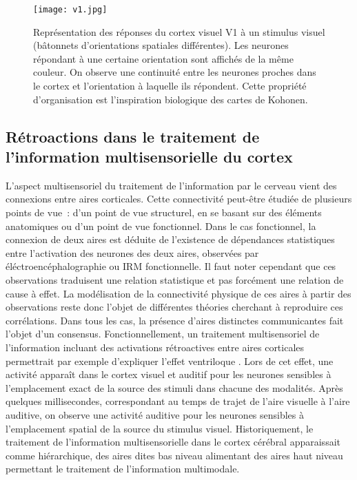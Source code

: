 \documentclass[../main]{subfiles}
\begin{document}
\begin{figure}
\centering
\texttt{[image: v1.jpg]}
\caption{Représentation des réponses du cortex visuel V1 à un stimulus visuel (bâtonnets d'orientations spatiales différentes). Les neurones répondant à une certaine orientation sont affichés de la même couleur. On observe une continuité entre les neurones proches dans le cortex et l'orientation à laquelle ils répondent. Cette propriété d'organisation est l'inspiration biologique des cartes de Kohonen.\label{fig:v1}}

\end{figure}

\subsection{Rétroactions dans le traitement de l'information multisensorielle du cortex}
L'aspect multisensoriel du traitement de l'information par le cerveau vient des connexions entre aires corticales.
Cette connectivité peut-être étudiée de plusieurs points de vue~: d'un point de vue structurel, en se basant sur des éléments anatomiques ou d'un point de vue fonctionnel.
Dans le cas fonctionnel, la connexion de deux aires est déduite de l'existence de dépendances statistiques entre l'activation des neurones des deux aires, observées par éléctroencéphalographie ou IRM fonctionnelle. Il faut noter cependant que ces observations traduisent une relation statistique et pas forcément une relation de cause à effet. 
La modélisation de la connectivité physique de ces aires à partir des observations reste donc l'objet de différentes théories cherchant à reproduire ces corrélations. 
Dans tous les cas, la présence d'aires distinctes communicantes fait l'objet d'un consensus. 
Fonctionnellement, un traitement multisensoriel de l'information incluant des activations rétroactives entre aires corticales permettrait par exemple d'expliquer l'effet ventriloque \cite{Bonath2007NeuralBO}. Lors de cet effet, une activité apparaît dans le cortex visuel et auditif pour les neurones sensibles à l'emplacement exact de la source des stimuli dans chacune des modalités. Après quelques millisecondes, correspondant au temps de trajet de l'aire visuelle à l'aire auditive, on observe une activité auditive pour les neurones sensibles à l'emplacement spatial de la source du stimulus visuel.
Historiquement, le traitement de l'information multisensorielle dans le cortex cérébral apparaissait comme hiérarchique, des aires dites bas niveau alimentant des aires haut niveau permettant le traitement de l'information multimodale. 
\end{document}
